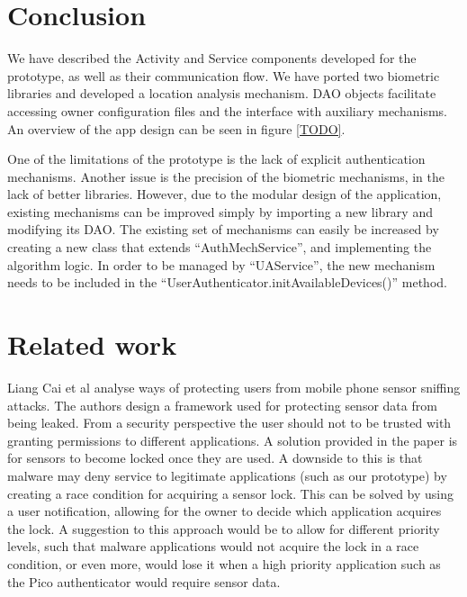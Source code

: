 \section{Conclusion}
We have described the Activity and Service components developed for the prototype, as well as their communication flow. We have ported two biometric libraries and developed a location analysis mechanism. DAO objects facilitate accessing owner configuration files and the interface with auxiliary mechanisms. An overview of the app design can be seen in figure \ref{TODO}.


One of the limitations of the prototype is the lack of explicit authentication mechanisms. Another issue is the precision of the biometric mechanisms, in the lack of better libraries. However, due to the modular design of the application, existing mechanisms can be improved simply by importing a new library and modifying its DAO. The existing set of mechanisms can easily be increased by creating a new class that extends ``AuthMechService'', and implementing the algorithm logic. In order to be managed by ``UAService'', the new mechanism needs to be included in the ``UserAuthenticator.initAvailableDevices()'' method.

\section{Related work}
Liang Cai et al \cite{cai2009defending} analyse ways of protecting users from mobile phone sensor sniffing attacks. The authors design a framework used for protecting sensor data from being leaked. From a security perspective the user should not to be trusted with granting permissions to different applications. A solution provided in the paper is for sensors to become locked once they are used. A downside to this is that malware may deny service to legitimate applications (such as our prototype) by creating a race condition for acquiring a sensor lock. This can be solved by using a user notification, allowing for the owner to decide which application acquires the lock. A suggestion to this approach would be to allow for different priority levels, such that malware applications would not acquire the lock in a race condition, or even more, would lose it when a high priority application such as the Pico authenticator would require sensor data.

